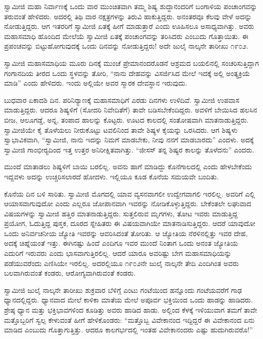  ಸ್ವಾಮೀಜಿ ಮಹಾ ನಿರ್ವಾಣಕ್ಕೆ ಒಂದು ವಾರ ಮುಂಚಿತವಾಗಿ ತಮ್ಮ ಶಿಷ್ಯ ಶುದ್ಧಾನಂದರಿಗೆ ಬಂಗಾಳಿಯ ಪಂಚಾಂಗವನ್ನು ತರುವಂತೆ ಹೇಳಿದರು. ಅದರಲ್ಲಿ ತಿಥಿ ವಾರ ನಕ್ಷತ್ರಗಳನ್ನು ತಿರುವಿ ಹಾಕುತ್ತಿದ್ದರು. ಅನಂತರವೂ ಕೆಲವು ವೇಳೆ ಅದನ್ನು ನೋಡುತ್ತಿದ್ದರು. ಆಗ ಇತರರಿಗೆ ಸ್ವಾಮೀಜಿ ಏತಕ್ಕೆ ಹೀಗೆ ಮಾಡುತ್ತಾರೆ ಎಂದು ಊಹಿಸಲೂ ಅಸಾಧ್ಯವಾಗಿತ್ತು. ಅವರು ಮಹಾಸಮಾಧಿ ಹೊಂದಿದ ಮೇಲೆಯೆ ಸ್ವಾಮೀಜಿ ಏತಕ್ಕೆ ಪಂಚಾಂಗವನ್ನು ತರಿಸಿದರು ಎಂಬುದು ಗೊತ್ತಾಯಿತು. ಈ ಪ್ರಪಂಚವನ್ನು ಬಿಟ್ಟುಹೋಗುವುದಕ್ಕೆ ಒಂದು ದಿನವನ್ನು ನೋಡುತ್ತಿದ್ದರು! ಅದೇ ಜುಲೈ ನಾಲ್ಕನೇ ತಾರೀಖು ೧೯೦೨. 

 ಸ್ವಾಮೀಜಿ ಮಹಾಸಮಾಧಿಯ ಮೂರು ದಿನಕ್ಕೆ ಮುಂಚೆ ಪ್ರೇಮಾನಂದರೊಡನೆ ಆಶ್ರಮದ ಬಯಲಿನಲ್ಲಿ ಸಂಚರಿಸುತ್ತಿದ್ದಾಗ ಗಂಗಾನದಿಯ ತೀರದ ಒಂದು ಸ್ಥಳವನ್ನು ತೋರಿ, “ನಾನು ದೇಹವನ್ನು ವಿಸರ್ಜಿಸಿದ ಮೇಲೆ ಇದಕ್ಕೆ ಅಲ್ಲಿ ಅಂತ್ಯಕ್ರಿಯೆ ಮಾಡಿ” ಎಂದು ಹೇಳಿದರು. ಇಂದು ಅಲ್ಲಿಯೇ ಅವರ ಸ್ಮಾರಕ ದೇವಸ್ಥಾನ ಇರುವುದು. 

 ಬುಧವಾರ ಏಕಾದಶಿ ದಿನ. ಪರಿನಿರ‍್ಯಾಣಕ್ಕೆ ಮಹಾಸಮಾಧಿಗೆ ಎರಡು ದಿನಗಳು ಉಳಿದಿವೆ. ಸ್ವಾಮೀಜಿ ಉಪವಾಸ ಮಾಡುತ್ತಿದ್ದರು. ಆದರೂ ಶಿಷ್ಯಳಿಗೆ (ಸೋದರಿ ನಿವೇದಿತೆಗೆ) ತಾವೇ ಬಡಿಸಬೇಕೆಂದಿದ್ದರು. ಅವಳಿಗೆ ಬೇಯಿಸಿದ ಹಲಸಿನ ಬೀಜ, ಆಲೂಗಡ್ಡೆ, ಅನ್ನ, ತಂಪಾದ ಹಾಲನ್ನು ಕೊಟ್ಟರು. ಊಟದ ಕಾಲದಲ್ಲಿ ಸಂತೋಷವಾಗಿ ಮಾತನಾಡುತ್ತಿದ್ದರು. ಸ್ವಾಮೀಜಿಯೇ ಕೈ ತೊಳೆಯಲು ನೀರುಕೊಟ್ಟು ಟವಲಿನಿಂದ ತಾವೇ ಶಿಷ್ಯಳ ಕೈಯನ್ನು ಒರಸಿದರು. ಆಗ ಶಿಷ್ಯಳು ಸ್ವಾಭಾವಿಕವಾಗಿ, “ಸ್ವಾಮೀಜಿ, ನಾನು ಇದನ್ನು ನಿಮಗೆ ಮಾಡಬೇಕು, ನೀವು ನನಗೆ ಮಾಡಬಾರದು” ಎಂದಳು. ಅದಕ್ಕೆ ಸ್ವಾಮೀಜಿ ಗಾಂಭೀರ‍್ಯದಿಂದ ಇತ್ತ ಉತ್ತರ ಅನಿರೀಕ್ಷಿತವಾಗಿತ್ತು. “ಜೀಸಸ್ ತನ್ನ ಶಿಷ್ಯರ ಕಾಲನ್ನು ತೊಳೆದನು” ಎಂದರು. 

 ಮುಂದೆ ಮಾತಾಡಲು ಶಿಷ್ಯಳಿಗೆ ಬಾಯಿ ಬರಲಿಲ್ಲ. ಅವನು ಹಾಗೆ ಮಾಡಿದ್ದು ಕೊನೆಗಾಲದಲ್ಲಿ ಎಂದು ಹೇಳಬೇಕೆಂದು ಇದ್ದವಳು ಅದನ್ನು ಉಚ್ಚರಿಸಲಾರದೆ ಹೋದಳು. ಇಲ್ಲಿಯೂ ಕೂಡ ಕೊನೆಯ ಸಮಯವೇ ಬಂದಿತು. 

\newpage

 ಕೊನೆಯ ದಿನ ಬಳಿ ಸಾರಿತು. ಸ್ವಾಮೀಜಿ ಮೊಗದಲ್ಲಿ ಯಾವ ವ್ಯಸನವಾಗಲೀ ಉದ್ವೇಗವಾಗಲಿ ಇರಲಿಲ್ಲ. ಅವರಿಗೆ ಎಲ್ಲಿ ಆಯಾಸವಾಗುವುದೋ ಎಂದು ಎಲ್ಲರೂ ಜೋಪಾನವಾಗಿ ಇವರನ್ನು ನೋಡಿಕೊಳ್ಳುತ್ತಿದ್ದರು. ಬೇಕೆಂತಲೇ ಲಘುವಾದ ವಿಷಯಗಳನ್ನು ಸ್ವಾಮೀಜಿ ಹತ್ತಿರ ಮಾತನಾಡುತ್ತಿದ್ದರು. ಸುತ್ತಲಿರುವ ಮೃಗಗಳು, ತೋಟ ಇವರು ಮಾಡುತ್ತಿದ್ದ ಪ್ರಯೋಗ, ಓದುತ್ತಿದ್ದ ಪುಸ್ತಕ, ದೂರದ ಸ್ನೇಹಿತರು ಈ ವಿಷಯವಾಗಿಯೇ ಮಾತನಾಡಿಸುತ್ತಿದ್ದರು. ಆದರೆ ಯಾವುದೋ ಒಂದು ಅನಿರ್ವಚನೀಯ ಜ್ಯೋತಿ ಇವರನ್ನು ಆವರಿಸಿದಂತೆ ತೋರಿತು. ಆ ಜ್ಯೋತಿಯ ನೆರಳಿನಲ್ಲಿತ್ತು ಇವರ ದೇಹ, ಅದಕ್ಕೆ ಚಿಹ್ನೆಯಂತೆ ಇತ್ತು. ಈಗಿನಷ್ಟು ಹಿಂದೆ ಎಂದಿಗೂ ಇವರ ಮುಂದೆ ನಿಂತಾಗ ಒಂದು ಅನಂತ ಜ್ಯೋತಿಯ ಎದುರಿಗೆ ಇರುವರು ಎಂದು ಭಾಸವಾಗುತ್ತಿರಲಿಲ್ಲ. ಆದರೆ ಯಾರೂ ಅವರಿಷ್ಟು ಬೇಗ ಮಹಾಸಮಾಧಿಯನ್ನು ಪಡೆಯುವರೆಂದು ಎಣಿಸಿಯೇ ಇರಲಿಲ್ಲ. ಅದರಲ್ಲಿಯೂ ೧೯೦೨ನೇ ಜುಲೈ ನಾಲ್ಕನೇ ತೇದಿ ಎಂದಿಗಿಂತ ಅವರು ಬಲವಾಗಿರುವಂತೆ ಕಂಡರು, ಆರೋಗ್ಯವಾಗಿರುವಂತೆ ಕಂಡರು. 

 ಸ್ವಾಮೀಜಿ ಜುಲೈ ನಾಲ್ಕನೇ ತಾರೀಖು ಶುಕ್ರವಾರ ಬೆಳಿಗ್ಗೆ ಎಂಟು ಗಂಟೆಯಿಂದ ಹನ್ನೊಂದು ಗಂಟೆಯವರೆಗೆ ಗಾಢ ಧ್ಯಾನದಲ್ಲಿದ್ದರು. ಧ್ಯಾನವಾದ ಮೇಲೆ ಕಾಳಿಕಾ ಮಾತೆಯ ಮೇಲೆ ಅಪೂರ್ವ ಭಕ್ತಿಯಿಂದ ಒಂದು ಹಾಡನ್ನು ಹಾಡಿದರು. ಶ್ರೇಷ್ಠ ಧ್ಯಾನ ಮತ್ತು ಭಕ್ತಿಭಾವಗಳಿಂದ ಕೂಡಿತ್ತು ಅವರು ಹಾಡಿದ ಹಾಡು. ಅಲ್ಲಿಂದ ಕೆಳಕ್ಕೆ ಇಳಿಯುವಾಗ ತಮಗೆ ತಾವೇ ಮತ್ತೊಬ್ಬರಿಗೆ ಸ್ವಲ್ಪ ಕೇಳುವಂತೆ ಹೀಗೆ ಹೇಳಿಕೊಂಡರು: “ಮತ್ತೊಬ್ಬ ವಿವೇಕಾನಂದ ಇದ್ದಿದ್ದರೆ ಈ ವಿವೇಕಾನಂದ ಏನು ಮಾಡಿದ ಎಂಬುದು ಗೊತ್ತಾಗುತ್ತಿತ್ತು. ಆದರೂ ಕಾಲಗರ್ಭದಲ್ಲಿ ಇಂತಹ ವಿವೇಕಾನಂದರು ಎಷ್ಟು ಹುದುಗಿರುವರೊ!” 

